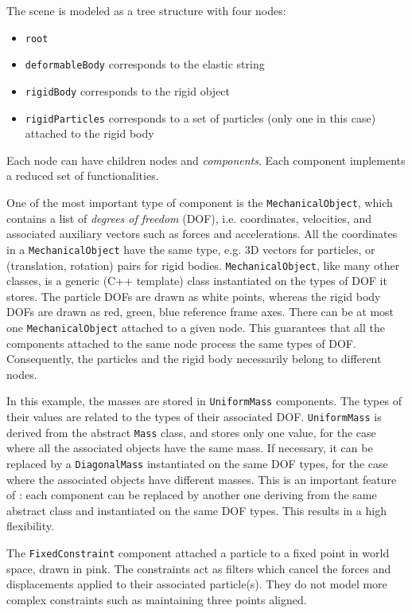 The scene is modeled as a tree structure with four nodes:
\begin{itemize}
 \item \texttt{root}
 \item \texttt{deformableBody} corresponds to the elastic string
 \item \texttt{rigidBody} corresponds to the rigid object
 \item \texttt{rigidParticles} corresponds to a set of particles (only one in this case) attached to the rigid body
\end{itemize}
Each node can have children nodes and \textit{components}. 
Each component implements a reduced set of functionalities.


One of the most important type of component is the \texttt{MechanicalObject}, which contains a list of \textit{degrees of freedom} (DOF), i.e. coordinates, velocities, and associated auxiliary vectors such as forces and accelerations.
All the coordinates in a \texttt{MechanicalObject} have the same type, e.g. 3D vectors for particles, or (translation, rotation) pairs for rigid bodies. 
\texttt{MechanicalObject}, like many other \sofa{} classes, is a generic (C++ template) class instantiated on the types of DOF it stores.
The particle DOFs are drawn as white points, whereas the rigid body DOFs are drawn as red, green, blue reference frame axes.
There can be at most one \texttt{MechanicalObject} attached to a given node. 
This guarantees that all the components attached to the same node process the same types of DOF. 
Consequently, the particles and the rigid body necessarily belong to different nodes.

In this example, the masses are stored in \texttt{UniformMass} components.
The types of their values are related to the types of their associated DOF.
\texttt{UniformMass} is derived from the abstract \texttt{Mass} class, and stores only one value, for the case where all the associated objects have the same mass. 
If necessary, it can be replaced by a \texttt{DiagonalMass} instantiated on the same DOF types, for the case where the associated objects have different masses. 
This is an important feature of \sofa: each component can be replaced by another one deriving from the same abstract class and instantiated on the same DOF types. 
This results in a high flexibility.

The \texttt{FixedConstraint} component attached a particle to a fixed point in world space, drawn in pink. 
The constraints act as filters which cancel the forces and displacements applied to their associated particle(s). 
They do not model more complex constraints such as maintaining three points aligned.

